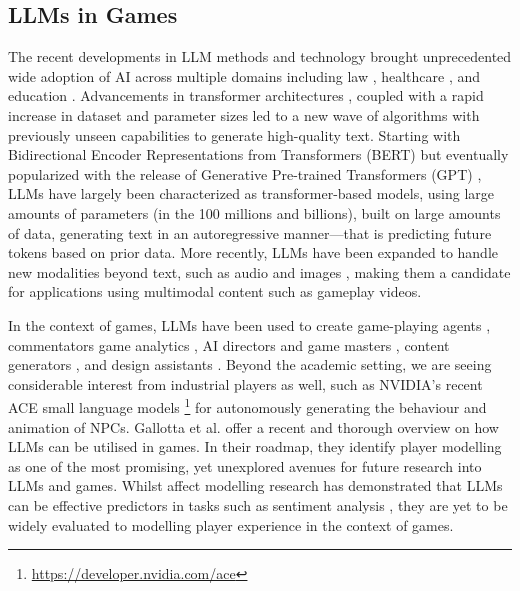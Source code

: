 \subsection{LLMs in Games}

The recent developments in LLM methods and technology 
brought unprecedented wide adoption of AI across multiple domains including law \cite{lai2024large}, healthcare \cite{nazi2024large}, and education \cite{moore2023empowering}. Advancements in transformer architectures \cite{vaswani2017attention}, coupled with a rapid increase in dataset and parameter sizes \cite{kaplan2020scaling} led to a new wave of algorithms with previously unseen capabilities to generate high-quality text. Starting with Bidirectional Encoder Representations from Transformers (BERT) \cite{devlin2018bert} but eventually popularized with the release of Generative Pre-trained Transformers (GPT) \cite{radford2019language,floridi2020gpt,openai2023gpt4}, LLMs have largely been characterized as transformer-based models, using large amounts of parameters (in the 100 millions and billions), built on large amounts of data, generating text in an autoregressive manner---that is predicting future tokens based on prior data. More recently, LLMs have been expanded to handle new modalities beyond text, such as audio and images \cite{touvron2023llama}, making them a candidate for applications using multimodal content such as gameplay videos.

In the context of games, LLMs have been used to create game-playing agents \cite{tsai2023can,hu2024survey}, commentators \cite{ranella2023towards} game analytics \cite{wang2024player2vec, ravsajski2024behave}, AI directors and game masters \cite{you2024dungeons, zhu2023calypso}, content generators \cite{sudhakaran2024mariogpt}, and design assistants \cite{gallotta2024llmaker}. 
% 
Beyond the academic setting, we are seeing considerable interest from industrial players as well, such as NVIDIA's recent ACE small language models \footnote{\url{https://developer.nvidia.com/ace}} for autonomously generating the behaviour and animation of NPCs. 
% 
Gallotta et al. \cite{gallotta2024large} offer a recent and thorough overview on how LLMs can be utilised in games. In their roadmap, they identify player modelling as one of the most promising, yet unexplored avenues for future research into LLMs and games. Whilst affect modelling research has demonstrated that LLMs can be effective predictors in tasks such as sentiment analysis \cite{mao2022biases}, they are yet to be widely evaluated to modelling player experience in the context of games. 

